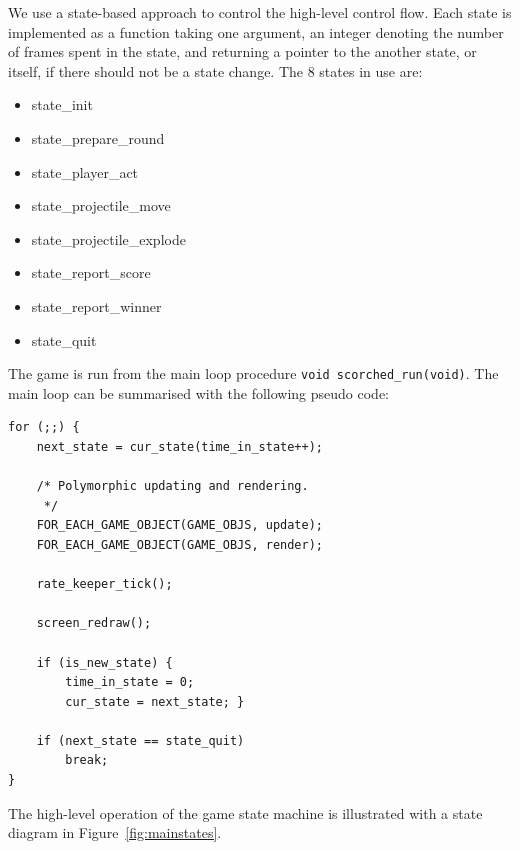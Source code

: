 \documentclass[a4paper,10pt]{article}
\newcommand{\isrc}[1]{\texttt{#1}}
\begin{document}
We use a state-based approach to control the high-level control flow.  Each
state is implemented as a function taking one argument, an integer denoting
the number of frames spent in the state, and returning a pointer to the
another state, or itself, if there should not be a state change. The 8 states
in use are:
{\small
\begin{itemize}
  \item \textsf{state\_init} 
  \item \textsf{state\_prepare\_round}
  \item \textsf{state\_player\_act}
  \item \textsf{state\_projectile\_move}
  \item \textsf{state\_projectile\_explode}
  \item \textsf{state\_report\_score}
  \item \textsf{state\_report\_winner}
  \item \textsf{state\_quit}
\end{itemize}
}
\noindent
The game is run from the main loop procedure \isrc{void scorched\_run(void)}.
The main loop can be summarised with the following pseudo code:
\begin{lstlisting}
for (;;) {
    next_state = cur_state(time_in_state++);

    /* Polymorphic updating and rendering.
     */
    FOR_EACH_GAME_OBJECT(GAME_OBJS, update); 
    FOR_EACH_GAME_OBJECT(GAME_OBJS, render); 

    rate_keeper_tick();

    screen_redraw();

    if (is_new_state) {
        time_in_state = 0;
        cur_state = next_state; }

    if (next_state == state_quit)
        break;
}
\end{lstlisting}

The high-level operation of the game state machine is illustrated with a state
diagram in Figure~\ref{fig:mainstates}.
\end{document}
